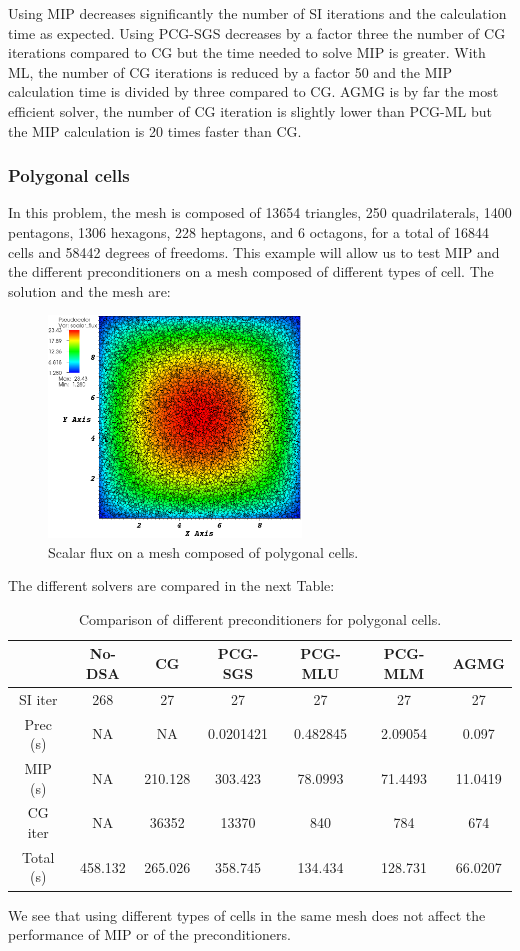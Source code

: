 Using MIP decreases significantly the number of SI iterations and the
calculation time as expected. Using PCG-SGS decreases by a factor three the 
number of CG iterations compared to CG but the time needed to solve MIP is
greater. With ML, the number of CG iterations is reduced by a factor 50 and 
the MIP calculation time is divided by three compared to CG. AGMG is by far 
the most efficient solver, the number of CG iteration is slightly lower 
than PCG-ML but the MIP calculation is 20 times faster than CG.

\subsubsection{Polygonal cells}
In this problem, the mesh is composed of 13654 triangles, 250 quadrilaterals,
1400 pentagons, 1306 hexagons, 228 heptagons, and 6 octagons, for a total of
16844 cells and 58442 degrees of freedoms. This example will allow us to test
MIP and the different preconditioners on a mesh composed of different types of
cell. The solution and the mesh are:
\begin{figure}[H]
\centering
\includegraphics[width=0.6\textwidth]{./Dsa/homog_poly_crop}
\caption{Scalar flux on a mesh composed of polygonal cells.}
\end{figure}
The different solvers are compared in the next Table:
\begin{table}[H]
\begin{center}
\caption{Comparison of different preconditioners for polygonal cells.}
\begin{tabular}{|c|c|c|c|c|c|c|}
\hline
 & No-DSA & CG & PCG-SGS & PCG-MLU & PCG-MLM & AGMG\\
\hline
SI iter & 268 & 27 & 27 & 27 & 27 & 27\\
Prec (s) & NA & NA & 0.0201421 & 0.482845 & 2.09054 & 0.097\\
MIP (s) & NA & 210.128 & 303.423 & 78.0993 & 71.4493 & 11.0419\\
CG iter & NA & 36352 & 13370 & 840 & 784 & 674\\
Total (s) & 458.132 & 265.026 & 358.745 & 134.434 & 128.731 & 66.0207\\
\hline
\end{tabular}
\end{center}
\end{table}
We see that using different types of cells in the same mesh does not affect
the performance of MIP or of the preconditioners. 

